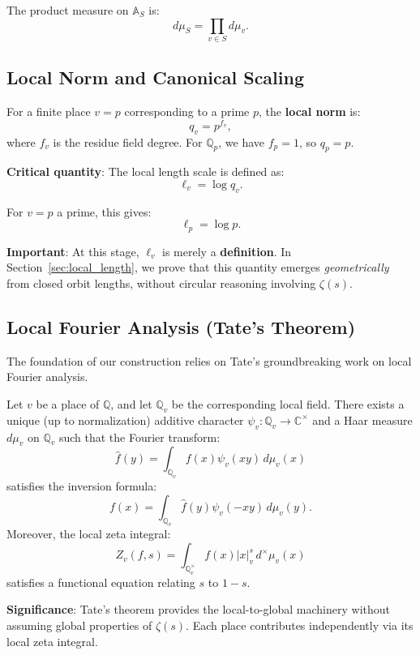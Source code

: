 The product measure on $\mathbb{A}_S$ is:
\[
d\mu_S = \prod_{v \in S} d\mu_v.
\]

\subsection{Local Norm and Canonical Scaling}

\begin{definition}
For a finite place $v = p$ corresponding to a prime $p$, the \textbf{local norm} is:
\[
q_v = p^{f_v},
\]
where $f_v$ is the residue field degree. For $\mathbb{Q}_p$, we have $f_p = 1$, so $q_p = p$.
\end{definition}

\textbf{Critical quantity}: The local length scale is defined as:
\[
\ell_v = \log q_v.
\]

For $v = p$ a prime, this gives:
\[
\ell_p = \log p.
\]

\textbf{Important}: At this stage, $\ell_v$ is merely a \textbf{definition}. In Section~\ref{sec:local_length}, we prove that this quantity emerges \emph{geometrically} from closed orbit lengths, without circular reasoning involving $\zeta(s)$.

\subsection{Local Fourier Analysis (Tate's Theorem)}

The foundation of our construction relies on Tate's groundbreaking work on local Fourier analysis.

\begin{theorem}[Tate, 1950]
\label{thm:tate}
Let $v$ be a place of $\mathbb{Q}$, and let $\mathbb{Q}_v$ be the corresponding local field. There exists a unique (up to normalization) additive character $\psi_v: \mathbb{Q}_v \to \mathbb{C}^\times$ and a Haar measure $d\mu_v$ on $\mathbb{Q}_v$ such that the Fourier transform:
\[
\hat{f}(y) = \int_{\mathbb{Q}_v} f(x) \psi_v(xy) \, d\mu_v(x)
\]
satisfies the inversion formula:
\[
f(x) = \int_{\mathbb{Q}_v} \hat{f}(y) \psi_v(-xy) \, d\mu_v(y).
\]
Moreover, the local zeta integral:
\[
Z_v(f, s) = \int_{\mathbb{Q}_v^\times} f(x) |x|_v^s \, d^\times \mu_v(x)
\]
satisfies a functional equation relating $s$ to $1-s$.
\end{theorem}

\textbf{Significance}: Tate's theorem provides the local-to-global machinery without assuming global properties of $\zeta(s)$. Each place contributes independently via its local zeta integral.


